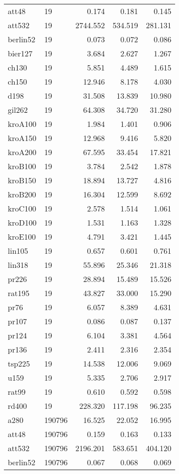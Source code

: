 \begin{center}
\begin{longtable}{llrrr}
att48  & 19 & 0.174 & 0.181 & 0.145\\
att532  & 19 & 2744.552 & 534.519 & 281.131\\
berlin52  & 19 & 0.073 & 0.072 & 0.086\\
bier127  & 19 & 3.684 & 2.627 & 1.267\\
ch130  & 19 & 5.851 & 4.489 & 1.615\\
ch150  & 19 & 12.946 & 8.178 & 4.030\\
d198  & 19 & 31.508 & 13.839 & 10.980\\
gil262  & 19 & 64.308 & 34.720 & 31.280\\
kroA100  & 19 & 1.984 & 1.401 & 0.906\\
kroA150  & 19 & 12.968 & 9.416 & 5.820\\
kroA200  & 19 & 67.595 & 33.454 & 17.821\\
kroB100  & 19 & 3.784 & 2.542 & 1.878\\
kroB150 & 19 & 18.894 & 13.727 & 4.816\\
kroB200  & 19 & 16.304 & 12.599 & 8.692\\
kroC100  & 19 & 2.578 & 1.514 & 1.061\\
kroD100  & 19 & 1.531 & 1.163 & 1.328\\
kroE100  & 19 & 4.791 & 3.421 & 1.445\\
lin105  & 19 & 0.657 & 0.601 & 0.761\\
lin318  & 19 & 55.896 & 25.346 & 21.318\\
pr226  & 19 & 28.894 & 15.489 & 15.526\\
rat195  & 19 & 43.827 & 33.000 & 15.290\\
pr76  & 19 & 6.057 & 8.389 & 4.631\\
pr107  & 19 & 0.086 & 0.087 & 0.137\\
pr124  & 19 & 6.104 & 3.381 & 4.564\\
pr136  & 19 & 2.411 & 2.316 & 2.354\\
tsp225  & 19 & 14.538 & 12.006 & 9.069\\
u159  & 19 & 5.335 & 2.706 & 2.917\\
rat99  & 19 & 0.610 & 0.592 & 0.598\\
rd400  & 19 & 228.320 & 117.198 & 96.235\\
a280 & 190796 & 16.525 & 22.052 & 16.995\\
att48  & 190796 & 0.159 & 0.163 & 0.133\\
att532  & 190796 & 2196.201 & 583.651 & 404.120\\
berlin52 & 190796 & 0.067 & 0.068 & 0.069\\

\end{longtable}
\end{center}
